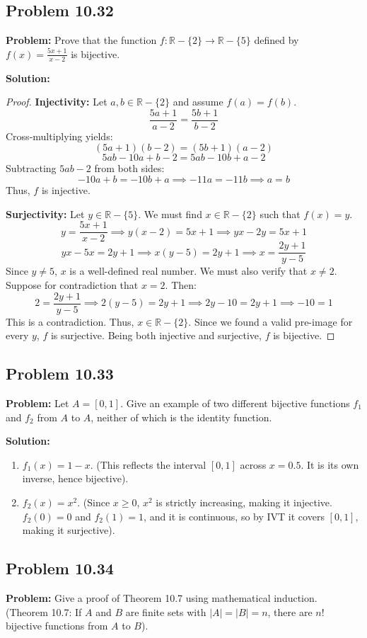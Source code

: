\documentclass[11pt, a4paper]{article}
\theoremstyle{definition}
\theoremstyle{remark}
\newcommand{\R}{\mathbb{R}}
\begin{document}
\subsection{Problem 10.32}
\textbf{Problem:} Prove that the function $f: \R - \{2\} \to \R - \{5\}$ defined by $f(x) = \frac{5x+1}{x-2}$ is bijective.

\textbf{Solution:}
\begin{proof}
\textbf{Injectivity:} Let $a, b \in \R - \{2\}$ and assume $f(a) = f(b)$.
\[ \frac{5a+1}{a-2} = \frac{5b+1}{b-2} \]
Cross-multiplying yields:
\[ (5a+1)(b-2) = (5b+1)(a-2) \]
\[ 5ab - 10a + b - 2 = 5ab - 10b + a - 2 \]
Subtracting $5ab - 2$ from both sides:
\[ -10a + b = -10b + a \implies -11a = -11b \implies a = b \]
Thus, $f$ is injective.

\textbf{Surjectivity:} Let $y \in \R - \{5\}$. We must find $x \in \R - \{2\}$ such that $f(x) = y$.
\[ y = \frac{5x+1}{x-2} \implies y(x-2) = 5x+1 \implies yx - 2y = 5x + 1 \]
\[ yx - 5x = 2y + 1 \implies x(y - 5) = 2y + 1 \implies x = \frac{2y+1}{y-5} \]
Since $y \neq 5$, $x$ is a well-defined real number. We must also verify that $x \neq 2$. Suppose for contradiction that $x = 2$. Then:
\[ 2 = \frac{2y+1}{y-5} \implies 2(y-5) = 2y+1 \implies 2y - 10 = 2y + 1 \implies -10 = 1 \]
This is a contradiction. Thus, $x \in \R - \{2\}$. Since we found a valid pre-image for every $y$, $f$ is surjective. 
Being both injective and surjective, $f$ is bijective.
\end{proof}

\subsection{Problem 10.33}
\textbf{Problem:} Let $A = [0, 1]$. Give an example of two different bijective functions $f_1$ and $f_2$ from $A$ to $A$, neither of which is the identity function.

\textbf{Solution:}
\begin{enumerate}
    \item $f_1(x) = 1 - x$. (This reflects the interval $[0,1]$ across $x=0.5$. It is its own inverse, hence bijective).
    \item $f_2(x) = x^2$. (Since $x \ge 0$, $x^2$ is strictly increasing, making it injective. $f_2(0)=0$ and $f_2(1)=1$, and it is continuous, so by IVT it covers $[0,1]$, making it surjective).
\end{enumerate}

\subsection{Problem 10.34}
\textbf{Problem:} Give a proof of Theorem 10.7 using mathematical induction. (Theorem 10.7: If $A$ and $B$ are finite sets with $|A|=|B|=n$, there are $n!$ bijective functions from $A$ to $B$).
\end{document}
